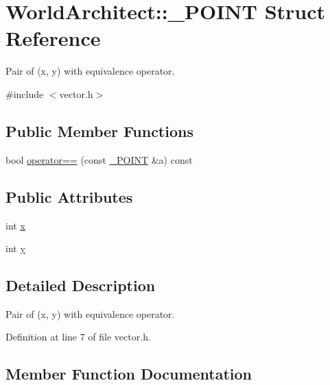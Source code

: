 \hypertarget{struct_world_architect_1_1___p_o_i_n_t}{}\section{World\+Architect\+::\+\_\+\+P\+O\+I\+NT Struct Reference}
\label{struct_world_architect_1_1___p_o_i_n_t}


Pair of (x, y) with equivalence operator.  




{\ttfamily \#include $<$vector.\+h$>$}

\subsection*{Public Member Functions}
\begin{DoxyCompactItemize}
\item 
bool \mbox{\hyperlink{struct_world_architect_1_1___p_o_i_n_t_a5dcd3df2ef3c4dcb4acb4655eaa26a82}{operator==}} (const \mbox{\hyperlink{struct_world_architect_1_1___p_o_i_n_t}{\+\_\+\+P\+O\+I\+NT}} \&a) const
\end{DoxyCompactItemize}
\subsection*{Public Attributes}
\begin{DoxyCompactItemize}
\item 
int \mbox{\hyperlink{struct_world_architect_1_1___p_o_i_n_t_a7b0711284f5eb40b2e68176710f1e0e0}{x}}
\item 
int \mbox{\hyperlink{struct_world_architect_1_1___p_o_i_n_t_a69bbd83e90480a2531f8b7fca51393e8}{y}}
\end{DoxyCompactItemize}


\subsection{Detailed Description}
Pair of (x, y) with equivalence operator. 

Definition at line 7 of file vector.\+h.



\subsection{Member Function Documentation}
\mbox{\label{struct_world_architect_1_1___p_o_i_n_t_a5dcd3df2ef3c4dcb4acb4655eaa26a82}} 
